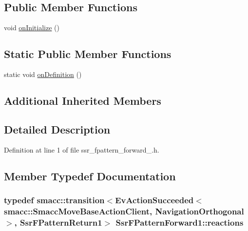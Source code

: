 \subsection*{Public Member Functions}
\begin{DoxyCompactItemize}
\item 
void \hyperlink{structSsrFPatternForward1_a532baa064c9773096c8fd6ce430ac4b3}{on\+Initialize} ()
\end{DoxyCompactItemize}
\subsection*{Static Public Member Functions}
\begin{DoxyCompactItemize}
\item 
static void \hyperlink{structSsrFPatternForward1_ab8a08022167461f22892be52f10bba9c}{on\+Definition} ()
\end{DoxyCompactItemize}
\subsection*{Additional Inherited Members}


\subsection{Detailed Description}


Definition at line 1 of file ssr\+\_\+fpattern\+\_\+forward\+\_.\+h.



\subsection{Member Typedef Documentation}
\subsubsection[{\texorpdfstring{reactions}{reactions}}]{\setlength{\rightskip}{0pt plus 5cm}typedef {\bf smacc\+::transition}$<$Ev\+Action\+Succeeded$<${\bf smacc\+::\+Smacc\+Move\+Base\+Action\+Client}, {\bf Navigation\+Orthogonal}$>$, {\bf Ssr\+F\+Pattern\+Return1}$>$ {\bf Ssr\+F\+Pattern\+Forward1\+::reactions}}\hypertarget{structSsrFPatternForward1_a9a3b01b8675bb587f7d5c698ff1e4858}{}\label{structSsrFPatternForward1_a9a3b01b8675bb587f7d5c698ff1e4858}


